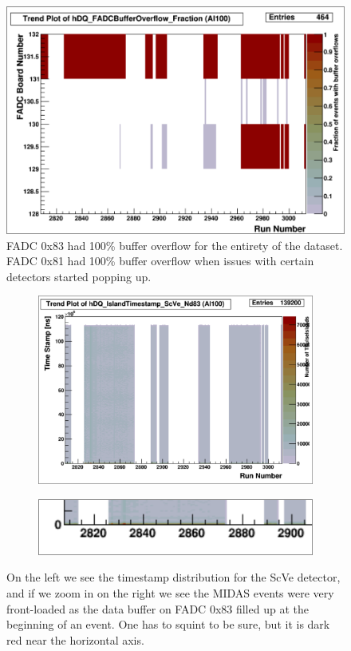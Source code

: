 \documentclass[a4paper]{article}
\begin{document}
\begin{figure}
  \includegraphics[width=0.9\linewidth]{figs/al100/buffer_overflow}
  \caption{FADC 0x83 had 100\% buffer overflow
    for the entirety of the dataset. FADC 0x81 had 100\% buffer overflow when
    issues with certain detectors started popping up.}
  \label{fig:al100_buffer_overflow}
\end{figure}

\begin{figure}
  \begin{subfigure}{0.5\textwidth}
    \includegraphics[width=0.9\linewidth]{figs/al100/scve_timestamps}
  \end{subfigure}%
  \begin{subfigure}{0.5\textwidth}
    \includegraphics[width=0.9\linewidth]{figs/al100/scve_timestamps_zoom}
  \end{subfigure}
  \caption{On the left we see the timestamp distribution for the ScVe detector,
    and if we zoom in on the right we see the MIDAS events were very front-loaded
    as the data buffer on FADC 0x83 filled up at the beginning of an event.
    One has to squint to be sure, but it is dark red near the horizontal axis.}
  \label{fig:al100_scve_timestamps}
\end{figure}
\end{document}
